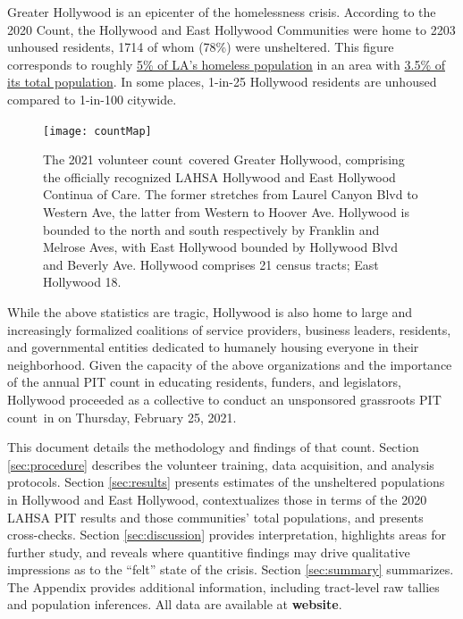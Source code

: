 \documentclass[11pt,twocolumn]{article}
\def\bfr{\bf\color{red}}
\def\Count{count}
\begin{document}
Greater Hollywood is an epicenter of the homelessness crisis. According to the 2020 Count, the 
Hollywood and East Hollywood Communities were home to 2203 unhoused residents, 1714 of whom 
(78\%) were unsheltered. This figure corresponds to roughly 
\href{https://www.lahsa.org/data?id=45-2020-homeless-count-by-community-city}
{5\% of LA's homeless population} in an area with \href{https://geomap.ffiec.gov/FFIECGeocMap/GeocodeMap1.aspx}{3.5\% of its total population}. In some places, 1-in-25 Hollywood residents are 
unhoused compared to 1-in-100 citywide.

\begin{figure}
	\centering
	\texttt{[image: countMap]}
	\caption{The 2021 volunteer \Count\ covered Greater Hollywood, comprising the 
			officially recognized LAHSA Hollywood and East Hollywood Continua
			of Care. The former stretches from Laurel Canyon Blvd to Western Ave,
			the latter from Western to Hoover Ave. Hollywood is bounded to the north
			and south respectively by Franklin	and Melrose Aves, with East Hollywood
			bounded by Hollywood Blvd and Beverly Ave. Hollywood comprises
			21 census tracts; East Hollywood 18.}
	\label{fig:map}	
\end{figure}

While the above statistics are tragic, Hollywood is also home to large and increasingly formalized
coalitions of service providers, business leaders, residents, and governmental entities dedicated to 
humanely housing everyone in their neighborhood. Given the capacity of the above organizations and 
the importance of the annual PIT count in educating residents, funders, and legislators, Hollywood 
proceeded as a collective to conduct an unsponsored grassroots PIT \Count\ in on Thursday, 
February 25, 2021.

This document details the methodology and findings of that \Count. 
Section \ref{sec:procedure} describes the volunteer training, data acquisition, 
and analysis protocols. Section \ref{sec:results} presents estimates of the unsheltered 
populations in Hollywood and East Hollywood, contextualizes those in terms of the 2020 
LAHSA PIT results and those communities' total populations, and presents cross-checks. 
Section \ref{sec:discussion} provides interpretation, highlights areas for further study, and 
reveals where quantitive findings may drive qualitative impressions as to the ``felt'' state of 
the crisis. Section \ref{sec:summary} summarizes. The Appendix provides additional information, 
including tract-level raw tallies and population inferences. All data are available at {\bfr website}.
\end{document}
